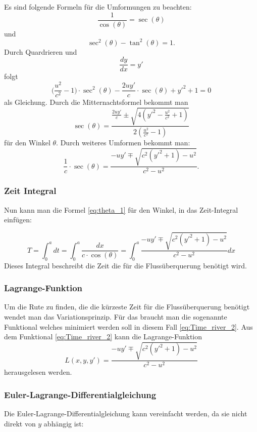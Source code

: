 Es sind folgende Formeln für die Umformungen zu beachten: \[\frac{1}{\cos(\theta)} = \sec(\theta)\] und \[\sec^2(\theta)-\tan^2(\theta) = 1.\] Durch Quardrieren und \[\frac{dy}{dx} = y'\] folgt 
\begin{equation}
    \biggl(\frac{u^2}{c^2}-1 \biggr) \cdot \sec^2(\theta) - \frac{2uy'}{c}\cdot \sec(\theta) + y'^2 +1 = 0
\end{equation}
als Gleichung. Durch die Mitternachtsformel bekommt man 
\begin{equation}
    \sec(\theta) = \frac{\frac{2uy'}{c} \pm \sqrt{4(y'^2-\frac{u^2}{c^2} + 1)}}{2(\frac{u^2}{c^2}-1)}
\end{equation}
für den Winkel \(\theta\). Durch weiteres Umformen bekommt man:
\begin{equation}
    \frac{1}{c}\cdot \sec(\theta) = \frac{-uy' \mp \sqrt{c^2(y'^2+1)-u^2}}{c^2-u^2} .\label{eq:theta_1}
\end{equation}


\subsubsection{Zeit Integral}

Nun kann man die Formel \eqref{eq:theta_1} für den Winkel, in das Zeit-Integral einfügen:

\begin{equation}
    T = \int_0^adt = \int_0^a\frac{dx}{c\cdot \cos(\theta)} = \int_0^a \frac{-uy' \mp \sqrt{c^2(y'^2+1)-u^2}}{c^2-u^2} dx
    \label{eq:Time_river_2} 
\end{equation}
Dieses Integral  beschreibt die Zeit die für die Flussüberquerung benötigt wird. 



\subsubsection{Lagrange-Funktion} 
Um die Rute zu finden, die die kürzeste Zeit für die Flussüberquerung benötigt wendet man das Variationsprinzip. Für das braucht man die sogenannte Funktional welches minimiert werden soll in diesem Fall \eqref{eq:Time_river_2}. 
Aus dem Funktional \eqref{eq:Time_river_2} kann die Lagrange-Funktion
\begin{equation}\label{eq:lagrange_integral}
    L(x, y, y') = \frac{-uy' \mp \sqrt{c^2(y'^2+1)-u^2}}{c^2-u^2}
\end{equation}
herausgelesen werden. 

\subsubsection{Euler-Lagrange-Differentialgleichung} Die Euler-Lagrange-Differentialgleichung kann vereinfacht werden, da sie nicht direkt von \(y\) abhängig ist:

